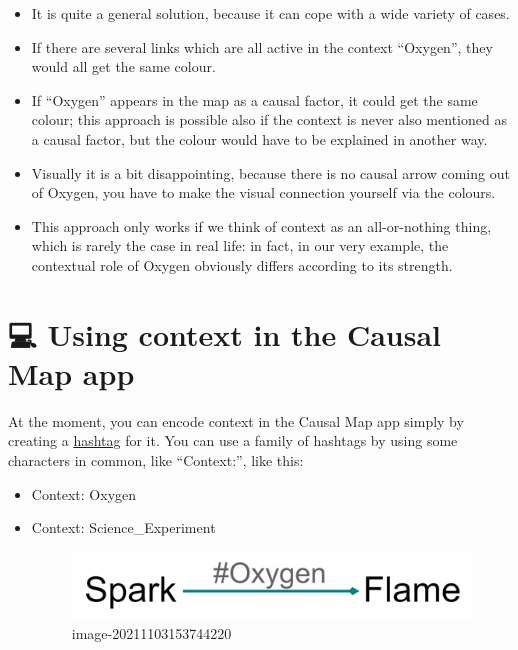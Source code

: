 \documentclass[
]{book}
\begin{document}
\begin{itemize}
\item
  It is quite a general solution, because it can cope with a wide variety of cases.
\item
  If there are several links which are all active in the context ``Oxygen'', they would all get the same colour.
\item
  If ``Oxygen'' appears in the map as a causal factor, it could get the same colour; this approach is possible also if the context is never also mentioned as a causal factor, but the colour would have to be explained in another way.
\item
  Visually it is a bit disappointing, because there is no causal arrow coming out of Oxygen, you have to make the visual connection yourself via the colours.
\item
  This approach only works if we think of context as an all-or-nothing thing, which is rarely the case in real life: in fact, in our very example, the contextual role of Oxygen obviously differs according to its strength.
\end{itemize}

\hypertarget{using-context-in-the-causal-map-app}{%
\section{💻 Using context in the Causal Map app}\label{using-context-in-the-causal-map-app}}

At the moment, you can encode context in the Causal Map app simply by creating a \protect\hyperlink{xmemosandhashtags}{hashtag} for it. You can use a family of hashtags by using some characters in common, like ``Context:'', like this:

\begin{itemize}
\item
  Context: Oxygen
\item
  Context: Science\_Experiment

  \begin{figure}
  \centering
  \includegraphics[width=6.77083in,height=\textheight]{_assets/image-20211103153744220.png}
  \caption{image-20211103153744220}
  \end{figure}
\end{itemize}
\end{document}

